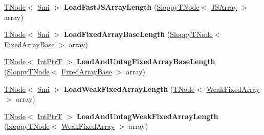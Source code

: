 \begin{DoxyCompactItemize}
\item 
\mbox{\label{classv8_1_1internal_1_1CodeStubAssembler_a729dbe4d3853b8950eafd8477b991a8c}} 
\mbox{\hyperlink{classv8_1_1internal_1_1compiler_1_1TNode}{T\+Node}}$<$ \mbox{\hyperlink{classv8_1_1internal_1_1Smi}{Smi}} $>$ {\bfseries Load\+Fast\+J\+S\+Array\+Length} (\mbox{\hyperlink{classv8_1_1internal_1_1compiler_1_1SloppyTNode}{Sloppy\+T\+Node}}$<$ \mbox{\hyperlink{classv8_1_1internal_1_1JSArray}{J\+S\+Array}} $>$ array)
\item 
\mbox{\label{classv8_1_1internal_1_1CodeStubAssembler_af533cc1909caa172a923f0418f28c936}} 
\mbox{\hyperlink{classv8_1_1internal_1_1compiler_1_1TNode}{T\+Node}}$<$ \mbox{\hyperlink{classv8_1_1internal_1_1Smi}{Smi}} $>$ {\bfseries Load\+Fixed\+Array\+Base\+Length} (\mbox{\hyperlink{classv8_1_1internal_1_1compiler_1_1SloppyTNode}{Sloppy\+T\+Node}}$<$ \mbox{\hyperlink{classv8_1_1internal_1_1FixedArrayBase}{Fixed\+Array\+Base}} $>$ array)
\item 
\mbox{\label{classv8_1_1internal_1_1CodeStubAssembler_ad34cc3b175258e3e6ed0f7f4a7b72e89}} 
\mbox{\hyperlink{classv8_1_1internal_1_1compiler_1_1TNode}{T\+Node}}$<$ \mbox{\hyperlink{structv8_1_1internal_1_1IntPtrT}{Int\+PtrT}} $>$ {\bfseries Load\+And\+Untag\+Fixed\+Array\+Base\+Length} (\mbox{\hyperlink{classv8_1_1internal_1_1compiler_1_1SloppyTNode}{Sloppy\+T\+Node}}$<$ \mbox{\hyperlink{classv8_1_1internal_1_1FixedArrayBase}{Fixed\+Array\+Base}} $>$ array)
\item 
\mbox{\label{classv8_1_1internal_1_1CodeStubAssembler_a6d51833948cd235e373836f3d7e09ba4}} 
\mbox{\hyperlink{classv8_1_1internal_1_1compiler_1_1TNode}{T\+Node}}$<$ \mbox{\hyperlink{classv8_1_1internal_1_1Smi}{Smi}} $>$ {\bfseries Load\+Weak\+Fixed\+Array\+Length} (\mbox{\hyperlink{classv8_1_1internal_1_1compiler_1_1TNode}{T\+Node}}$<$ \mbox{\hyperlink{classv8_1_1internal_1_1WeakFixedArray}{Weak\+Fixed\+Array}} $>$ array)
\item 
\mbox{\label{classv8_1_1internal_1_1CodeStubAssembler_af01289806701bd747a21b40948c5e5a0}} 
\mbox{\hyperlink{classv8_1_1internal_1_1compiler_1_1TNode}{T\+Node}}$<$ \mbox{\hyperlink{structv8_1_1internal_1_1IntPtrT}{Int\+PtrT}} $>$ {\bfseries Load\+And\+Untag\+Weak\+Fixed\+Array\+Length} (\mbox{\hyperlink{classv8_1_1internal_1_1compiler_1_1SloppyTNode}{Sloppy\+T\+Node}}$<$ \mbox{\hyperlink{classv8_1_1internal_1_1WeakFixedArray}{Weak\+Fixed\+Array}} $>$ array)

\end{DoxyCompactItemize}
